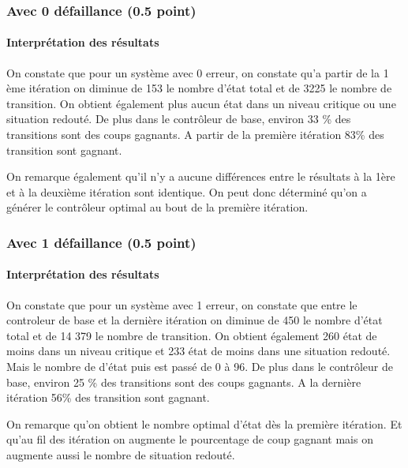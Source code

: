 \documentclass[a4paper]{book}
\begin{document}
\subsubsection{Avec 0 défaillance (0.5 point)}



%
%
\paragraph{Interprétation des résultats}
\begin{flushleft}
    On constate que pour un système avec 0 erreur, on constate qu'a partir de la 1 ème itération on diminue de 153 le nombre d'état total
    et de 3225 le nombre de transition. On obtient également plus aucun état dans un niveau critique ou une situation redouté.
    De plus dans le  contrôleur de base, environ 33 \% des transitions sont des coups gagnants.
    A partir de la première itération 83\% des transition sont gagnant.
    
    On remarque également qu'il n'y a aucune différences entre le résultats à la 1ère et à la deuxième itération sont identique.
    On peut donc déterminé qu'on a générer le contrôleur optimal au bout de la première itération. 
        
\end{flushleft}

\subsubsection{Avec 1 défaillance (0.5 point)}




%
\paragraph{Interprétation des résultats}
\begin{flushleft}
    On constate que pour un système avec 1 erreur, on constate que entre le controleur de base et la dernière itération on diminue de 450 le nombre d'état total
    et de  14 379 le nombre de transition. On obtient également 260  état de moins dans un niveau critique et 233 état de moins dans une situation redouté.
    Mais le nombre de d'état puis est passé de 0 à 96. 
    De plus dans le  contrôleur de base, environ 25 \% des transitions sont des coups gagnants.
    A la dernière itération 56\% des transition sont gagnant.
    
    On remarque qu'on obtient le nombre optimal d'état dès la première itération. Et qu'au fil des itération on augmente le pourcentage de coup gagnant mais on augmente aussi le nombre de situation redouté.
    
\end{flushleft}
\end{document}
